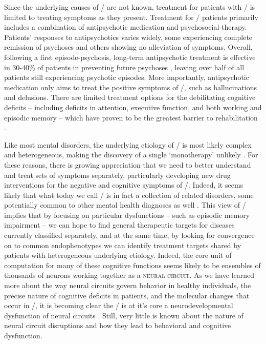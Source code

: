 Since the underlying causes of \scz/ are not known, treatment for patients with \scz/ is limited to treating symptoms as they present.
Treatment for \scz/ patients primarily includes a combination of antipsychotic medication and psychosocial therapy.
Patients' responses to antipsychotics varies widely, some experiencing complete remission of psychoses and others showing no alleviation of symptoms.
Overall, following a first episode-psychosis, long-term antipsychotic treatment is effective in 30-40\% of patients in preventing future psychoses \citep{Boyer2007, Insel2010a}, leaving over half of all patients still experiencing psychotic episodes.
More importantly, antipsychotic medication only aims to treat the positive symptoms of \scz/, such as hallucinations and delusions.
There are limited treatment options for the debilitating cognitive deficits -- including deficits in attention, executive function, and both working and episodic memory -- which have proven to be the greatest barrier to rehabilitation \citep{Lieberman2005, Harrison2001, O'Carroll2000, Hyman2003}.

Like most mental disorders, the underlying etiology of \scz/ is most likely complex and heterogeneous, making the discovery of a single `monotherapy' unlikely \citep{Hyman2003}.
For these reasons, there is growing appreciation that we need to better understand and treat sets of symptoms separately, particularly developing new drug interventions for the negative and cognitive symptoms of \scz/.
Indeed, it seems likely that what today we call \scz/ is in fact a collection of related disorders, some potentially common to other mental health diagnoses as well \citep{Insel2010a}.
This view of \scz/ implies that by focusing on particular dysfunctions -- such as episodic memory impairment -- we can hope to find general therapeutic targets for diseases currently classified separately, and at the same time, by looking for convergence on to common endophenotypes we can identify treatment targets shared by patients with heterogeneous underlying etiology.
Indeed, the core unit of computation for many of these cognitive functions seems likely to be ensembles of thousands of neurons working together as a \textsc{neural circuit}.
As we have learned more about the way neural circuits govern behavior in healthy individuals, the precise nature of cognitive deficits in patients, and the molecular changes that occur in \scz/, it is becoming clear the \scz/ is at it's core a neurodevelopmental dysfunction of neural circuits \citep{Arguello2012, Insel2010a, Insel2010b, Lewis2002}.
Still, very little is known about the nature of neural circuit disruptions and how they lead to behavioral and cognitive dysfunction.


